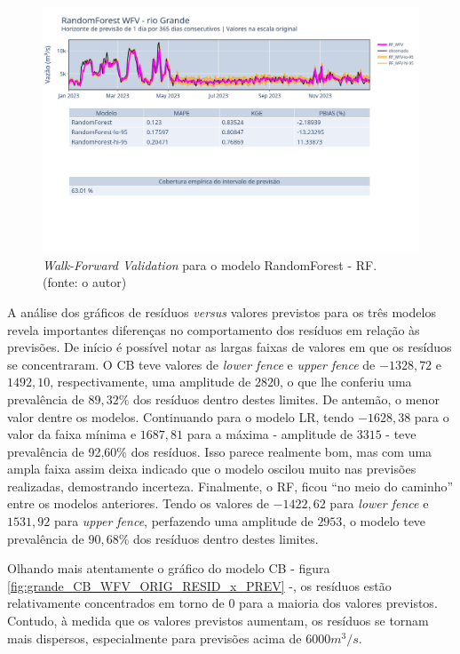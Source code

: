\begin{figure}[!h]
\centering
\includegraphics[scale=0.33]{Figuras/rio_grande/wfv/RF/RF_WFV_ORIG.png}
\caption{\textit{Walk-Forward Validation} para o modelo RandomForest - RF.\\(fonte: o autor)}
\label{fig:grande_RF_WFV_ORIG}
\end{figure}
\clearpage

A análise dos gráficos de resíduos \textit{versus} valores previstos para os três modelos revela importantes diferenças no comportamento dos resíduos em relação às previsões. De início é possível notar as largas faixas de valores em que os resíduos se concentraram. O CB teve valores de \textit{lower fence} e \textit{upper fence} de $-1328,72$ e $1492,10$, respectivamente, uma amplitude de $2820$, o que lhe conferiu uma prevalência de $89,32\%$ dos resíduos dentro destes limites. De antemão, o menor valor dentre os modelos. Continuando para o modelo LR, tendo $-1628,38$ para o valor da faixa mínima e $1687,81$ para a máxima - amplitude de $3315$ - teve prevalência de 92,60\% dos resíduos. Isso parece realmente bom, mas com uma ampla faixa assim deixa indicado que o modelo oscilou muito nas previsões realizadas, demostrando incerteza. Finalmente, o RF, ficou ``no meio do caminho'' entre os modelos anteriores. Tendo os valores de $-1422,62$ para \textit{lower fence} e $1531,92$ para \textit{upper fence}, perfazendo uma amplitude de $2953$, o modelo teve prevalência de $90,68\%$ dos resíduos dentro destes limites.

Olhando mais atentamente o gráfico do modelo CB - figura \ref{fig:grande_CB_WFV_ORIG_RESID_x_PREV} -, os resíduos estão relativamente concentrados em torno de $0$ para a maioria dos valores previstos. Contudo, à medida que os valores previstos aumentam, os resíduos se tornam mais dispersos, especialmente para previsões acima de $6000 m^3/s$. 


